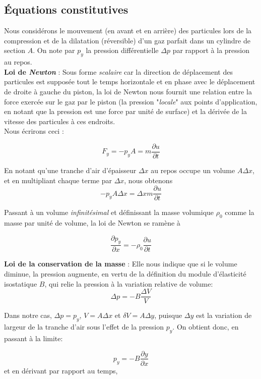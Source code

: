 \subsection{Équations constitutives} 

Nous considérons le mouvement (en avant et en arrière) des particules  lors de la compression et de la dilatation (réversible) d'un gaz parfait dans un cylindre de section $A$. On note par $p_{y}$ la pression différentielle $\Delta p$ par rapport à la pression au repos.\\

\textbf{Loi de \textit{Newton}} : Sous forme \textit{scalaire} car la direction de déplacement des particules est supposée tout le temps horizontale et en phase avec le déplacement
de droite à gauche du piston, la loi de Newton nous fournit une relation entre la force exercée sur le gaz par le piston (la pression "\textit{locale}" aux points d'application, en notant que la pression est une force par unité de surface) et la dérivée de la vitesse des particules à ces endroits. \\ 

Nous écrirons ceci : 

$$F_{y} = -p_{y} A = m \frac{\partial{u}}{\partial t}$$ 

En notant qu'une tranche d'air d'épaisseur $\Delta x$  au repos occupe un volume $A\Delta x$, et en multipliant chaque terme par $\Delta x$, nous obtenons 
$$-p_{y} A\Delta x = \Delta x m \frac{\partial{u}}{\partial t}$$ 

Passant à  un volume \textit{infinitésimal} et définissant la masse volumique 
$\rho_{0}$ comme la masse par unité de volume, la loi de Newton se ramène à

\[\frac{\partial p_{y}}{\partial x} = - \rho_{0} \frac{\partial{u}}{\partial t}\]


\textbf{Loi de la conservation de la masse}  : Elle nous indique que si le volume diminue, la pression augmente, en vertu de la définition du module d'élasticité isostatique $B$, qui relie la pression à la variation relative de volume:
\[\Delta p  = - B \frac{\Delta V}{V} \]

Dans notre cas, $\Delta p = p_y$, $V = A \Delta x$ et $\delta V = A \Delta y$, puisque $\Delta y$ est la variation de largeur de la tranche d'air sous l'effet de la pression $p_y$. On obtient donc, en passant à la limite:

\[p_{y}  = - B \frac{\partial y}{\partial x}\] et en dérivant par rapport au temps,

